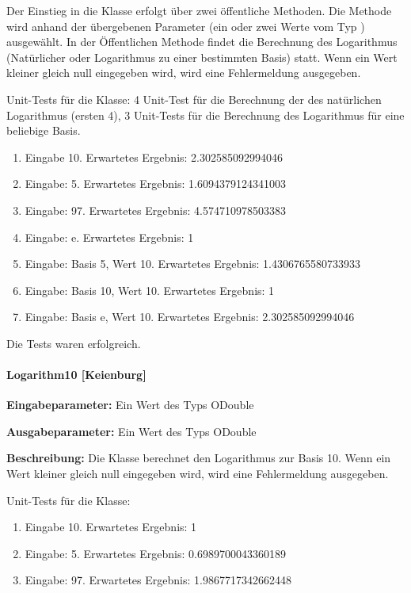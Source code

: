 Der Einstieg in die Klasse erfolgt über zwei öffentliche Methoden. Die Methode wird anhand der übergebenen Parameter (ein oder zwei Werte vom Typ ) ausgewählt. In der Öffentlichen Methode findet die Berechnung des Logarithmus (Natürlicher oder Logarithmus zu einer bestimmten Basis) statt. Wenn ein Wert kleiner gleich null eingegeben wird, wird eine Fehlermeldung ausgegeben.

Unit-Tests für die Klasse: 4 Unit-Test für die Berechnung der des natürlichen Logarithmus (ersten 4), 3 Unit-Tests für die Berechnung des Logarithmus für eine beliebige Basis. 

\begin{enumerate}
\item Eingabe 10. Erwartetes Ergebnis: 2.302585092994046
\item Eingabe: 5. Erwartetes Ergebnis: 1.6094379124341003
\item Eingabe: 97. Erwartetes Ergebnis: 4.574710978503383
\item Eingabe: e. Erwartetes Ergebnis: 1
\item Eingabe: Basis 5, Wert 10. Erwartetes Ergebnis: 1.4306765580733933
\item Eingabe: Basis 10, Wert 10. Erwartetes Ergebnis: 1
\item Eingabe: Basis e, Wert 10. Erwartetes Ergebnis: 2.302585092994046
\end{enumerate}

Die Tests waren erfolgreich.

\paragraph{Logarithm10 [Keienburg]}

\textbf{Eingabeparameter:} Ein Wert des Typs ODouble

\textbf{Ausgabeparameter:} Ein Wert des Typs ODouble

\textbf{Beschreibung:} Die Klasse berechnet den Logarithmus zur Basis 10. Wenn ein Wert kleiner gleich null eingegeben wird, wird eine Fehlermeldung ausgegeben. 

Unit-Tests für die Klasse: 

\begin{enumerate}
\item Eingabe 10. Erwartetes Ergebnis: 1
\item Eingabe: 5. Erwartetes Ergebnis: 0.6989700043360189
\item Eingabe: 97. Erwartetes Ergebnis: 1.9867717342662448
\end{enumerate}

